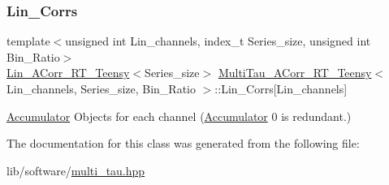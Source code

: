 \subsubsection{\texorpdfstring{Lin\+\_\+\+Corrs}{Lin\_Corrs}}
{\footnotesize\ttfamily template$<$unsigned int Lin\+\_\+channels, index\+\_\+t Series\+\_\+size, unsigned int Bin\+\_\+\+Ratio$>$ \\
\hyperlink{classLin__ACorr__RT__Teensy}{Lin\+\_\+\+A\+Corr\+\_\+\+R\+T\+\_\+\+Teensy}$<$Series\+\_\+size$>$ \hyperlink{classMultiTau__ACorr__RT__Teensy}{Multi\+Tau\+\_\+\+A\+Corr\+\_\+\+R\+T\+\_\+\+Teensy}$<$ Lin\+\_\+channels, Series\+\_\+size, Bin\+\_\+\+Ratio $>$\+::Lin\+\_\+\+Corrs\mbox{[}Lin\+\_\+channels\mbox{]}\hspace{0.3cm}{\ttfamily [private]}}



\hyperlink{classAccumulator}{Accumulator} Objects for each channel (\hyperlink{classAccumulator}{Accumulator} \textquotesingle{}0\textquotesingle{} is redundant.) 



The documentation for this class was generated from the following file\+:\begin{DoxyCompactItemize}
\item 
lib/software/\hyperlink{multi__tau_8hpp}{multi\+\_\+tau.\+hpp}\end{DoxyCompactItemize}
